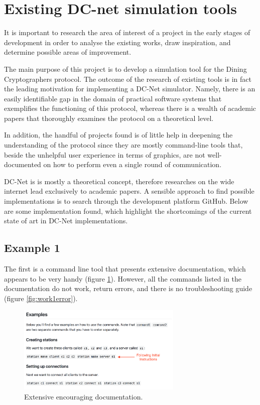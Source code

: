 \section{Existing DC-net simulation tools} \label{sec:similarWorks}
It is important to research the area of interest of a project in the early stages of development in order to analyse the existing works, draw inspiration, and determine possible areas of improvement. \newline

The main purpose of this project is to develop a simulation tool for the Dining Cryptographers protocol. The outcome of the research of existing tools is in fact the leading motivation for implementing a DC-Net simulator. Namely, there is an easily identifiable gap in the domain of practical software systems that exemplifies the functioning of this protocol, whereas there is a wealth of academic papers that thoroughly examines the protocol on a theoretical level. 

In addition, the handful of projects found is of little help in deepening the understanding of the protocol since they are mostly command-line tools that, beside the unhelpful user experience in terms of graphics, are not well-documented on how to perform even a single round of communication. \newline

DC-Net is is mostly a theoretical concept, therefore researches on the wide internet lead exclusively to academic papers. A sensible approach to find possible implementations is to search through the development platform GitHub. Below are some implementation found, which highlight the shortcomings of the current state of art in DC-Net implementations.

\subsection{Example 1}
The first is a command line tool that presents extensive documentation, which appears to be very handy (figure \ref{fig:work1documentation}). However, all the commands listed in the documentation do not work, return errors, and there is no troubleshooting guide (figure \ref{fig:work1error}).

\begin{figure}[h!]
    \centering
    \includegraphics[width=0.7\textwidth]{Images/work1WellDocumented.png}
    \caption{Extensive encouraging documentation.}
    \label{fig:work1documentation}
\end{figure}

